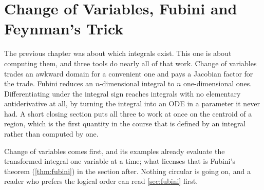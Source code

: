 \chapter{Change of Variables, Fubini and Feynman's Trick}
\label{ch:change_of_variables}

The previous chapter was about which integrals exist. This one is about computing them, and three
tools do nearly all of that work. Change of variables trades an awkward domain for a convenient one and pays a Jacobian
factor for the trade. Fubini reduces an $n$-dimensional integral to $n$ one-dimensional ones.
Differentiating under the integral sign reaches integrals with no elementary antiderivative at
all, by turning the integral into an ODE in a parameter it never had. A short closing section puts
all three to work at once on the centroid of a region, which is the first quantity in the course
that is defined by an integral rather than computed by one.

Change of variables comes first, and its examples already evaluate the transformed integral one
variable at a time; what licenses that is Fubini's theorem (\cref{thm:fubini}) in the section
after. Nothing circular is going on, and a reader who prefers the logical order can read
\cref{sec:fubini} first.






